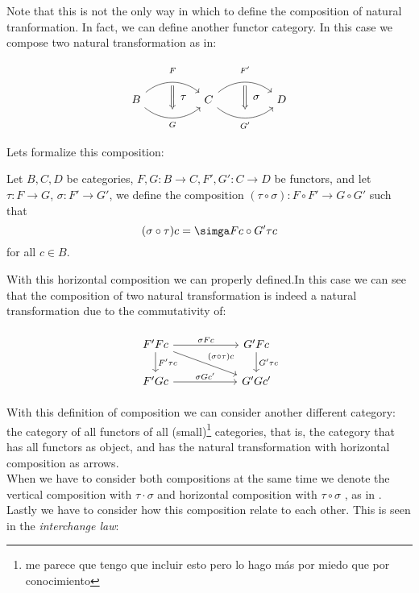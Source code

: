 Note that this is not the only way in which to define the composition of natural tranformation. In fact, we can define another functor category. In this case we compose two natural transformation as in:

\[
\begin{tikzcd}[column sep=huge]
B
  \arrow[bend left=40]{r}[name=F,label=above:$\scriptstyle F$]{}
  \arrow[bend right=40]{r}[name=G,label=below:$\scriptstyle G$]{} &
C
  \arrow[bend left=40]{r}[name=F',label=above:$\scriptstyle F'$]{}
  \arrow[bend right=40]{r}[name=G',label=below:$\scriptstyle G'$]{}&
D
    \arrow[shorten <=3pt,shorten >=3pt,Rightarrow,to path={(F) -- node[label=right:$\tau$] {} (G)}]{}
\arrow[shorten <=3pt,shorten >=3pt,Rightarrow,to path={(F') -- node[label=right:$\sigma$] {} (G')}]{}
\end{tikzcd}
\]

Lets formalize this composition:
\begin{definition}\label{horizontal-composition}
Let $B,C,D$ be categories, $F,G: B \to C, F',G':C\to D$ be functors, and let $\tau: F \to G$, $\sigma:F'\to G'$, we define the composition $(\tau \circ \sigma): F\circ F' \to G\circ G'$ such that $$(\sigma \circ \tau) c = \simga F c \circ G' \tau c$$  for all $c\in B$.
\end{definition}

With this horizontal composition we can properly defined.In this case we can see that the composition of two natural transformation is indeed a natural transformation due to the commutativity of:

\[
  \begin{tikzpicture}
  \node {\begin{tikzcd}[column sep=20mm]
      F'Fc      \ar[r,"\sigma F c"]
      \ar[d,"F'\tau c"]
      \ar[dr,"(\sigma\circ \tau)c"]
      & G'Fc\ar[d,"G'\tau c"]\\
      F'Gc\ar[r,"\sigma Gc'"] & G'Gc'
  \end{tikzcd}};
\end{tikzpicture}
\]


With this definition of composition we can consider another different category: the category of all functors of all (small)\footnote{me parece que tengo que incluir esto pero lo hago más por miedo que por conocimiento} categories, that is, the category that has all functors as object, and has the natural transformation with horizontal composition as arrows.\\

When we have to consider both compositions at the same time we denote the vertical composition with $\tau \cdot \sigma$ and horizontal composition with $\tau \circ \sigma$ , as in  \cite{mac2013categories}. Lastly we have to consider how this composition relate to each other. This is seen in the \emph{interchange law}:\\

